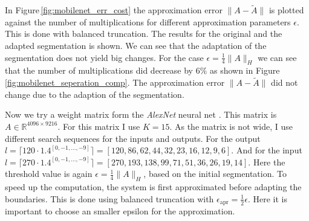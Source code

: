 \documentclass[doctype=mastersthesis,BCOR=15mm,biblatex]{ldvbook}%
\begin{document}
In Figure\,\ref{fig:mobilenet_err_cost} the approximation error $\| A-\tilde{A} \|$ is plotted against the number of multiplications for different approximation parameters $\epsilon$.
This is done with balanced truncation.
The results for the original and the adapted segmentation is shown.
We can see that the adaptation of the segmentation does not yield big changes.
For the case $\epsilon = \frac{1}{4} \|A\|_H$ we can see that the number of multiplications 
did decrease by $6\%$ as shown in Figure\,\ref{fig:mobilenet_seperation_comp}.
The approximation error $\| A-\tilde{A} \|$ did not change due to the adaption of the segmentation.


Now we try a weight matrix form the \emph{AlexNet} neural net \cite{krizhevsky_one_2014}.
This matrix is $A \in \mathbb{R}^{4096 \times 9216}$.
For this matrix I use $K=15$.
As the matrix is not wide, I use different search sequences for the inputs and outputs.
For the output $l =\lceil  120 \cdot  1.4^{[0,-1,\dots,-9]} \rceil =  [120,  86,  62,  44,  32,  23,  16,  12,   9,   6]$.
And for the input $l =\lceil 270 \cdot 1.4^{[0,-1,\dots,-9]} \rceil=  [270, 193, 138,  99,  71,  51,  36,  26,  19,  14]$.
Here the threshold value is again $\epsilon = \frac{1}{4} \|A\|_H$, based on the initial segmentation.
To speed up the computation, the system is first approximated before adapting the boundaries.
This is done using balanced truncation with $\epsilon_{\text{apr}}=\frac{1}{2} \epsilon$.
Here it is important to choose an smaller epsilon for the approximation.
\end{document}
